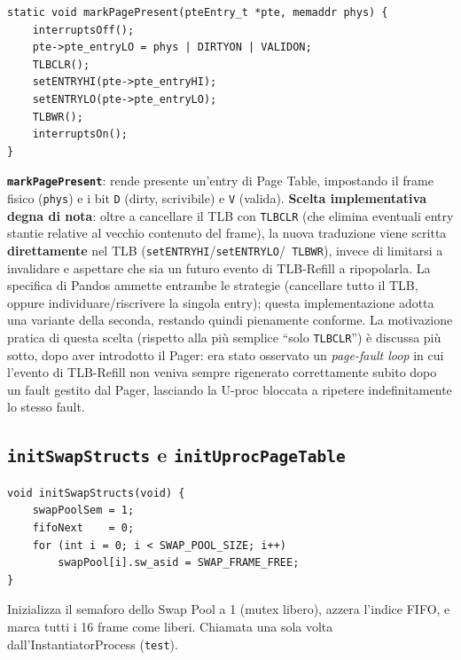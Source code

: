 \documentclass[11pt,a4paper]{article}
\newcommand{\code}[1]{\texttt{#1}}
\newcommand{\func}[1]{\textbf{\texttt{#1}}}
\begin{document}
\begin{lstlisting}
static void markPagePresent(pteEntry_t *pte, memaddr phys) {
    interruptsOff();
    pte->pte_entryLO = phys | DIRTYON | VALIDON;
    TLBCLR();
    setENTRYHI(pte->pte_entryHI);
    setENTRYLO(pte->pte_entryLO);
    TLBWR();
    interruptsOn();
}
\end{lstlisting}
\func{markPagePresent}: rende presente un'entry di Page Table, impostando
il frame fisico (\code{phys}) e i bit \code{D} (dirty, scrivibile) e
\code{V} (valida). \textbf{Scelta implementativa degna di nota}: oltre a
cancellare il TLB con \code{TLBCLR} (che elimina eventuali entry stantie
relative al vecchio contenuto del frame), la nuova traduzione viene scritta
\textbf{direttamente} nel TLB (\code{setENTRYHI}/\code{setENTRYLO}/\code{
TLBWR}), invece di limitarsi a invalidare e aspettare che sia un futuro
evento di TLB-Refill a ripopolarla. La specifica di Pandos ammette entrambe
le strategie (cancellare tutto il TLB, oppure individuare/riscrivere la
singola entry); questa implementazione adotta una variante della seconda,
restando quindi pienamente conforme. La motivazione pratica di questa
scelta (rispetto alla più semplice ``solo \code{TLBCLR}'') è discussa più
sotto, dopo aver introdotto il Pager: era stato osservato un
\emph{page-fault loop} in cui l'evento di TLB-Refill non veniva sempre
rigenerato correttamente subito dopo un fault gestito dal Pager, lasciando
la U-proc bloccata a ripetere indefinitamente lo stesso fault.

\subsection{\func{initSwapStructs} e \func{initUprocPageTable}}
\label{sub:init-swap-pgtbl}
\begin{lstlisting}
void initSwapStructs(void) {
    swapPoolSem = 1;
    fifoNext    = 0;
    for (int i = 0; i < SWAP_POOL_SIZE; i++)
        swapPool[i].sw_asid = SWAP_FRAME_FREE;
}
\end{lstlisting}
Inizializza il semaforo dello Swap Pool a 1 (mutex libero), azzera l'indice
FIFO, e marca tutti i 16 frame come liberi. Chiamata una sola volta
dall'InstantiatorProcess (\code{test}).
\end{document}
